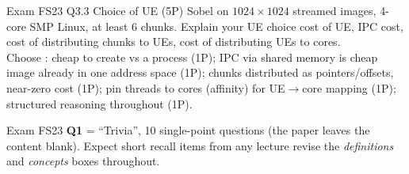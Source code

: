 \begin{example2}{Exam FS23 Q3.3 Choice of UE (5P)}
    Sobel on $1024\times1024$ streamed images, 4-core SMP Linux, at least 6 chunks. Explain your UE choice cost of UE, IPC cost, cost of distributing chunks to UEs, cost of distributing UEs to cores.
     \\ 
    Choose : cheap to create vs a process (1P); IPC via shared memory is cheap image already in one address space (1P); chunks distributed as pointers/offsets, near-zero cost (1P); pin threads to cores (affinity) for UE$\to$core mapping (1P); structured reasoning throughout (1P).
\end{example2}

\begin{remark}
    Exam FS23 \textbf{Q1} = ``Trivia'', 10 single-point questions (the paper leaves the content blank). Expect short recall items from any lecture revise the \emph{definitions} and \emph{concepts} boxes throughout.
\end{remark}

